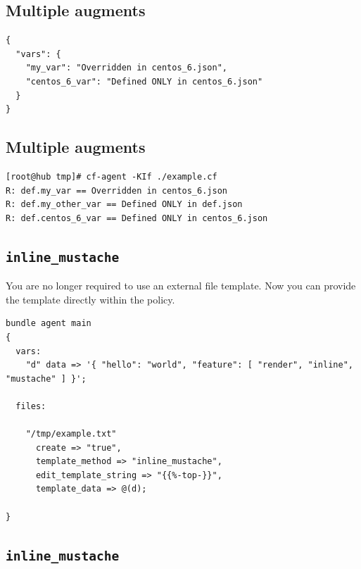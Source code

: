 \documentclass[11pt]{article}
\begin{document}
\subsection*{Multiple augments}
\label{sec:orgcd6b25b}

\begin{verbatim}
{
  "vars": {
    "my_var": "Overridden in centos_6.json",
    "centos_6_var": "Defined ONLY in centos_6.json"
  }
}
\end{verbatim}

\subsection*{Multiple augments}
\label{sec:org431fdb4}

\begin{verbatim}
[root@hub tmp]# cf-agent -KIf ./example.cf 
R: def.my_var == Overridden in centos_6.json
R: def.my_other_var == Defined ONLY in def.json
R: def.centos_6_var == Defined ONLY in centos_6.json
\end{verbatim}

\subsection*{\texttt{inline\_mustache}}
\label{sec:org0573f7c}

\begin{NOTES}
You are no longer required to use an external file template. Now you can
provide the template directly within the policy.
\end{NOTES}

\begin{verbatim}
bundle agent main
{
  vars:
    "d" data => '{ "hello": "world", "feature": [ "render", "inline", "mustache" ] }';

  files:

    "/tmp/example.txt"
      create => "true",
      template_method => "inline_mustache",
      edit_template_string => "{{%-top-}}",
      template_data => @(d);

}
\end{verbatim}

\subsection*{\texttt{inline\_mustache}}
\label{sec:org404c161}
\end{document}
